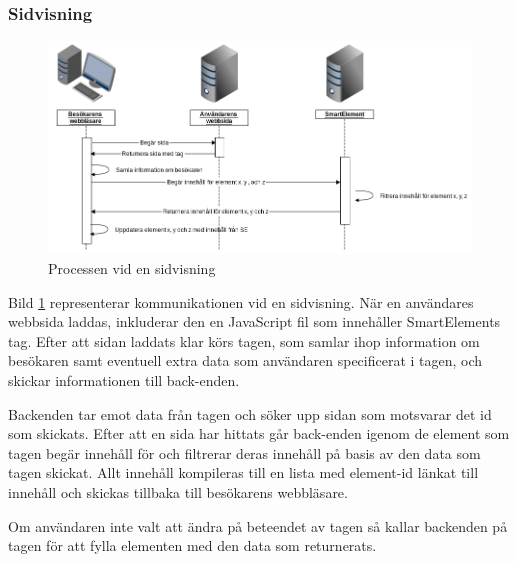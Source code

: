 \subsubsection{Sidvisning}

\begin{figure}[h!]
\centering
\includegraphics[width=150mm]{assets/images/smelementactivity.png}
\caption{Processen vid en sidvisning}
\label{pageviewprocess}
\end{figure}

Bild \ref{pageviewprocess} representerar kommunikationen vid en sidvisning. När en användares webbsida laddas, inkluderar den en JavaScript fil som innehåller SmartElements tag. Efter att sidan laddats klar körs tagen, som samlar ihop information om besökaren samt eventuell extra data som användaren specificerat i tagen, och skickar informationen till back-enden.

Backenden tar emot data från tagen och söker upp sidan som motsvarar det id som skickats. Efter att en sida har hittats går back-enden igenom de element som tagen begär innehåll för och filtrerar deras innehåll på basis av den data som tagen skickat. Allt innehåll kompileras till en lista med element-id länkat till innehåll och skickas tillbaka till besökarens webbläsare.

Om användaren inte valt att ändra på beteendet av tagen så kallar backenden på tagen för att fylla elementen med den data som returnerats.